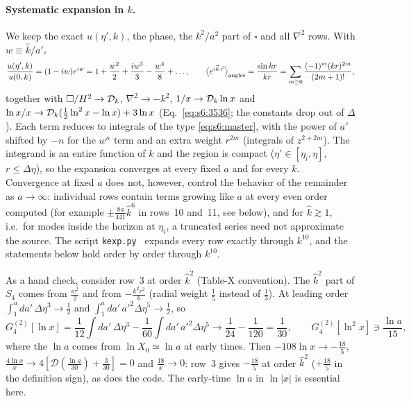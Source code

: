 \documentclass[aps,prd,onecolumn,10pt,nofootinbib,floatfix]{revtex4-2}
\newcommand{\Dop}{\mathcal{D}}
\newcommand{\khat}{\hat k}
\begin{document}
\paragraph*{Systematic expansion in $k$.}
We keep the exact $u(\eta',k)$, the phase, the $k^2/a^2$ part of $\square$ and all $\nabla^2$ rows. With $w\equiv\khat/a'$,
\begin{equation}
\frac{u(\eta',k)}{u(0,k)}=(1-iw)e^{iw}=1+\frac{w^2}2+\frac{iw^3}3-\frac{w^4}8+\ldots,\qquad
\big\langle e^{i\vec k\cdot\vec r}\big\rangle_{\rm angles}=\frac{\sin kr}{kr}=\sum_{m\ge0}\frac{(-1)^m(kr)^{2m}}{(2m+1)!},
\label{eq:s6:kser}
\end{equation}
together with $\square/H^2\to\mathcal{D}_k$, $\nabla^2\to-k^2$, $1/x\to\mathcal{D}_k\ln x$ and
$\ln x/x\to\mathcal{D}_k(\frac12\ln^2x-\ln x)+3\ln x$ (Eq.~\eqref{eq:s6:3536}; the constants drop out of $\Delta$). Each term
reduces to integrals of the type \eqref{eq:s6:master}, with the power of $a'$ shifted by $-n$ for the $w^n$ term and an
extra weight $r^{2m}$ (integrals of $z^{2+2m}$). The integrand is an entire function of $k$ and the region is compact
($\eta'\in[\eta_i,\eta]$, $r\le\Delta\eta$), so the expansion converges at every fixed $a$ and for every $k$. Convergence at fixed
$a$ does not, however, control the behavior of the remainder as $a\to\infty$: individual rows contain terms growing like $a$ at every
even order computed (for example $\pm\frac{8a}{441}\khat^6$ in rows~10 and~11, see below), and for $\khat\gtrsim1$, i.e.\ for modes inside the
horizon at $\eta_i$, a truncated series need not approximate the source. The script \texttt{kexp.py}~\cite{ref:repo} expands every
row exactly through $k^{10}$, and the statements below hold order by order through $k^{10}$.

As a hand check, consider row~3 at order $\khat^2$ (Table-X convention). The $\khat^2$ part of $S_4$ comes from
$\frac{w^2}2$ and from $-\frac{k^2r^2}6$ (radial weight $\frac15$ instead of $\frac13$). At leading order
$\int_1^a da'\,\Delta\eta^3\to\frac12$ and $\int_1^a da'\,a'^2\Delta\eta^5\to\frac12$, so
\begin{equation}
G^{(2)}_4[\ln x]=\frac1{12}\int\!da'\,\Delta\eta^3-\frac1{60}\int\!da'\,a'^2\Delta\eta^5\to\frac1{24}-\frac1{120}=\frac1{30},
\qquad G^{(2)}_4[\ln^2x]\ni\frac{\ln a}{15},
\label{eq:s6:G2}
\end{equation}
where the $\ln a$ comes from $\ln X_0\simeq\ln a$ at early times. Then $-108\ln x\to-\frac{18}5$,
$\frac{4\ln x}x\to4[\Dop(\frac{\ln a}{30})+\frac3{30}]=0$ and $\frac{18}x\to0$: row~3 gives $-\frac{18}5$ at order
$\khat^2$ ($+\frac{18}5$ in the definition sign), as does the code. The early-time $\ln a$ in $\ln|x|$ is essential here.
\end{document}
